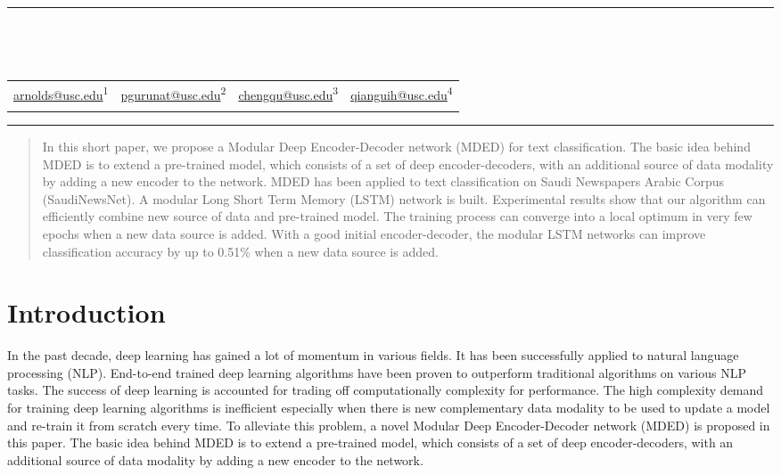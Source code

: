 \documentclass[12pt]{article}
\makeatletter
\newcommand\Mark[1]{\textsuperscript#1}
\def\maketitle{
	\par\rule{\textwidth}{2pt}
	\par\hfill
	\begin{centering}
	\begingroup
	\centering
	{\par\textbf{\LARGE\@title}\\[1.5em]
	\large\par{\textit{\@author}}}\\[1em]
	\begin{tabular}{*{4}{>{\centering}p{.23\textwidth}}}
	\url{arnolds@usc.edu}\Mark{1} & \url{pgurunat@usc.edu}\Mark{2} & \url{chengqu@usc.edu}\Mark{3} & \url{qianguih@usc.edu}\Mark{4} \tabularnewline
	9013085897 & 2251924199 & 2385279985 & 9532576000
	\end{tabular}\par
	\endgroup
	\par\rule{\textwidth}{2pt}
	\end{centering}
}
\makeatother
\begin{document}
\thispagestyle{empty}
\maketitle
\hfill
\begin{abstract}

In this short paper, we propose a Modular Deep Encoder-Decoder network (MDED) for text classification. The basic idea behind MDED is to extend a pre-trained model, which consists of a set of deep encoder-decoders, with an additional source of data modality by adding a new encoder to the network. MDED has been applied to text classification on Saudi Newspapers Arabic Corpus (SaudiNewsNet). A modular Long Short Term Memory (LSTM) network is built. Experimental results show that our algorithm can efficiently combine new source of data and pre-trained model. The training process can converge into a local optimum in very few epochs when a new data source is added. With a good initial encoder-decoder, the modular LSTM networks can improve classification accuracy by up to 0.51\% when a new data source is added.

\end{abstract}

\section{Introduction}\label{introduction}


In the past decade, deep learning has gained a lot of momentum in various fields. It has been successfully applied to natural language processing (NLP). End-to-end trained deep learning algorithms have been proven to outperform traditional algorithms on various NLP tasks. The success of deep learning is accounted for trading off computationally complexity for performance. The high complexity demand for training deep learning algorithms is inefficient especially when there is new complementary data modality to be used to update a model and re-train it from scratch every time. To alleviate this problem, a novel Modular Deep Encoder-Decoder network (MDED) is proposed in this paper. The basic idea behind MDED is to extend a pre-trained model, which consists of a set of deep encoder-decoders, with an additional source of data modality by adding a new encoder to the network. 
\end{document}

